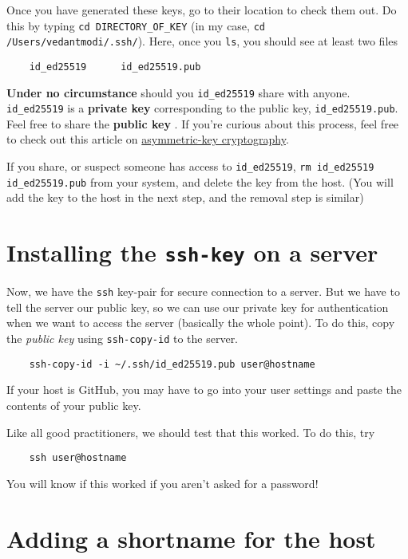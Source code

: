 \documentclass[12pt]{article}
\begin{document}
Once you have generated these keys, go to their location to check them out. Do
this by typing \texttt{cd DIRECTORY\_OF\_KEY} (in my case, \texttt{cd
/Users/vedantmodi/.ssh/}). Here, once you \texttt{ls}, you should see at least
two files \begin{verbatim}
    id_ed25519      id_ed25519.pub
\end{verbatim}

\textbf{Under no circumstance} should you \texttt{id\_ed25519} share with
anyone. \texttt{id\_ed25519} is a \textbf{private key} corresponding to the
public key, \texttt{id\_ed25519.pub}. Feel free to share the \textbf{public key}
. If you're curious about this process, feel free to check out this article on
\href{https://en.wikipedia.org/wiki/Public-key_cryptography}{asymmetric-key
cryptography}. 

If you share, or suspect someone has access to \texttt{id\_ed25519}, \texttt{rm
id\_ed25519 id\_ed25519.pub} from your system, and delete the key from the
host. (You will add the key to the host in the next step, and the removal step
is similar)

\section{Installing the \texttt{ssh-key} on a server}

Now, we have the \texttt{ssh} key-pair for secure connection to a server. But
we have to tell the server our public key, so we can use our private key for
authentication when we want to access the server (basically the whole point). To do this, copy the \textit{public key} using \texttt{ssh-copy-id} to the
server. 

\begin{verbatim}
    ssh-copy-id -i ~/.ssh/id_ed25519.pub user@hostname
\end{verbatim}

If your host is GitHub, you may have to go into your user settings and paste
the contents of your public key.

\vspace{0.5\baselineskip}

Like all good practitioners, we should test that this worked. To do this, try 
\begin{verbatim}
    ssh user@hostname
\end{verbatim}

You will know if this worked if you aren't asked for a password! 

\section{Adding a shortname for the host}
\end{document}
